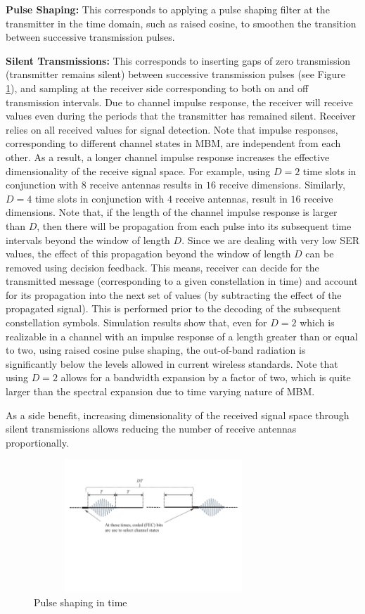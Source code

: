 \textbf{Pulse Shaping:} This corresponds to applying a pulse shaping filter at the transmitter in the time domain, such as raised cosine, to smoothen the transition between successive transmission pulses.


\textbf{Silent Transmissions:} This corresponds to inserting gaps of zero transmission (transmitter remains silent) between successive transmission pulses (see Figure \ref{pulse shaping}), and sampling at the receiver side corresponding to both on and off transmission intervals. Due to channel impulse response, the receiver will receive values even during the periods that the transmitter has remained silent. Receiver relies on all received values for signal detection. Note that impulse responses, corresponding to different channel states in MBM, are independent from each other. As a result, a longer channel impulse response increases the effective dimensionality of the receive signal space. For example, using $D = 2$ time slots in conjunction with $8$ receive antennas results in $16$ receive dimensions. Similarly, $D = 4$ time slots in conjunction with $4$ receive antennas, result in $16$ receive dimensions. Note that, if the length of the channel impulse response is larger than $D$, then there will be propagation from each pulse into its subsequent time intervals beyond the window of length $D$. Since we are dealing with very low SER values, the effect of this propagation beyond the window of length $D$ can be removed using decision feedback. This means, receiver can decide for the transmitted message (corresponding to a given constellation in time) and account for its propagation into the next set of values (by subtracting the effect of the propagated signal). This is performed prior to the decoding of the subsequent constellation symbols. Simulation results show that, even for $D = 2$ which is realizable in a channel with an impulse response of a length greater than or equal to two, using raised cosine pulse shaping, the out-of-band radiation is significantly below the levels allowed in current wireless standards. Note that using $D = 2$ allows for a bandwidth expansion by a factor of two, which is quite larger than the spectral expansion due to time varying nature of MBM. 

As a side benefit, increasing dimensionality of the received signal space through silent transmissions allows reducing the number of receive antennas proportionally.  


\begin{figure}[t]
\centering
\hspace{1cm}
\includegraphics[height = 5cm, width = 9cm, trim = 0 8cm 0 0cm]{./fig/pulseShaping}
\caption{Pulse shaping in time}
\label{pulse shaping}
\end{figure}

